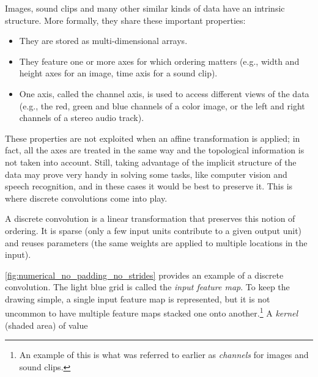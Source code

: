 Images, sound clips and many other similar kinds of data have an intrinsic
structure. More formally, they share these important properties:

\begin{itemize}
    \item They are stored as multi-dimensional arrays.
    \item They feature one or more axes for which ordering matters (e.g., width
        and height axes for an image, time axis for a sound clip).
    \item One axis, called the channel axis, is used to access different views
        of the data (e.g., the red, green and blue channels of a color image, or
        the left and right channels of a stereo audio track).
\end{itemize}

These properties are not exploited when an affine transformation is applied; in
fact, all the axes are treated in the same way and the topological information
is not taken into account. Still, taking advantage of the implicit structure of
the data may prove very handy in solving some tasks, like computer vision and
speech recognition, and in these cases it would be best to preserve it. This is
where discrete convolutions come into play.

A discrete convolution is a linear transformation that preserves this notion of
ordering. It is sparse (only a few input units contribute to a given output
unit) and reuses parameters (the same weights are applied to multiple locations
in the input).

\autoref{fig:numerical_no_padding_no_strides} provides an example of a discrete
convolution. The light blue grid is called the {\em input feature map}. To keep
the drawing simple, a single input feature map is represented, but it is not
uncommon to have multiple feature maps stacked one onto another.\footnote{%
    An example of this is what was referred to earlier as {\em channels\/} for
    images and sound clips.}
A {\em kernel\/} (shaded area) of value

\begin{figure}[H]
    \centering
\end{figure}

